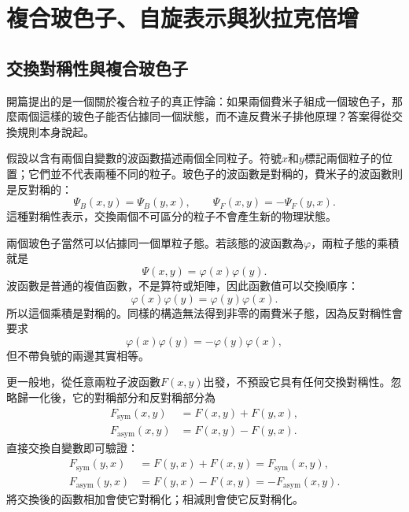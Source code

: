 \chapter{複合玻色子、自旋表示與狄拉克倍增}

\section{交換對稱性與複合玻色子}

開篇提出的是一個關於複合粒子的真正悖論：如果兩個費米子組成一個玻色子，那麼兩個這樣的玻色子能否佔據同一個狀態，而不違反費米子排他原理？答案得從交換規則本身說起。

假設以含有兩個自變數的波函數描述兩個全同粒子。符號\(x\)和\(y\)標記兩個粒子的位置；它們並不代表兩種不同的粒子。玻色子的波函數是對稱的，費米子的波函數則是反對稱的：
\begin{equation}
\Psi_B(x,y)=\Psi_B(y,x),
\qquad
\Psi_F(x,y)=-\Psi_F(y,x).
\end{equation}
這種對稱性表示，交換兩個不可區分的粒子不會產生新的物理狀態。

兩個玻色子當然可以佔據同一個單粒子態。若該態的波函數為\(\varphi\)，兩粒子態的乘積就是
\begin{equation}
\Psi(x,y)=\varphi(x)\varphi(y).
\end{equation}
波函數是普通的複值函數，不是算符或矩陣，因此函數值可以交換順序：
\begin{equation}
\varphi(x)\varphi(y)=\varphi(y)\varphi(x).
\end{equation}
所以這個乘積是對稱的。同樣的構造無法得到非零的兩費米子態，因為反對稱性會要求
\begin{equation}
\varphi(x)\varphi(y)=-\varphi(y)\varphi(x),
\end{equation}
但不帶負號的兩邊其實相等。

更一般地，從任意兩粒子波函數\(F(x,y)\)出發，不預設它具有任何交換對稱性。忽略歸一化後，它的對稱部分和反對稱部分為
\begin{align}
F_{\mathrm{sym}}(x,y)&=F(x,y)+F(y,x),\\
F_{\mathrm{asym}}(x,y)&=F(x,y)-F(y,x).
\end{align}
直接交換自變數即可驗證：
\begin{align}
F_{\mathrm{sym}}(y,x)
&=F(y,x)+F(x,y)
=F_{\mathrm{sym}}(x,y),\\
F_{\mathrm{asym}}(y,x)
&=F(y,x)-F(x,y)
=-F_{\mathrm{asym}}(x,y).
\end{align}
將交換後的函數相加會使它對稱化；相減則會使它反對稱化。

